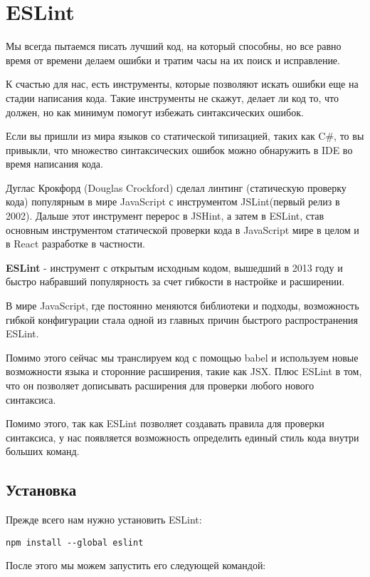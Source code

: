 \documentclass[12pt]{book}
\begin{document}
\section{ESLint}

Мы всегда пытаемся писать лучший код, на который способны, но все равно время от времени делаем ошибки и тратим часы на их поиск и исправление.

К счастью для нас, есть инструменты, которые позволяют искать ошибки еще на стадии написания кода. Такие инструменты не скажут, делает ли код то, что должен, но как минимум помогут избежать синтаксических ошибок.

Если вы пришли из мира языков со статической типизацией, таких как C\#, то вы привыкли, что множество синтаксических ошибок можно обнаружить в IDE во время написания кода.

Дуглас Крокфорд (Douglas Crockford) сделал линтинг (статическую проверку кода) популярным в мире JavaScript с инструментом JSLint(первый релиз в 2002). Дальше этот инструмент перерос в JSHint, а затем в ESLint, став основным инструментом статической проверки кода в JavaScript мире в целом и в React разработке в частности.

\textbf{ESLint} - инструмент с открытым исходным кодом, вышедший в 2013 году и быстро набравший популярность за счет гибкости в настройке и расширении.

В мире JavaScript, где постоянно меняются библиотеки и подходы, возможность гибкой конфигурации стала одной из главных причин быстрого распространения ESLint. 

Помимо этого сейчас мы транслируем код с помощью babel и используем новые возможности языка и сторонние расширения, такие как JSX. Плюс ESLint в том, что он позволяет дописывать расширения для проверки любого нового синтаксиса.

Помимо этого, так как ESLint позволяет создавать правила для проверки синтаксиса, у нас появляется возможность определить единый стиль кода внутри больших команд.


\subsection*{Установка}

Прежде всего нам нужно установить ESLint:

\begin{lstlisting}
npm install --global eslint
\end{lstlisting}

После этого мы можем запустить его следующей командой:
\end{document}
